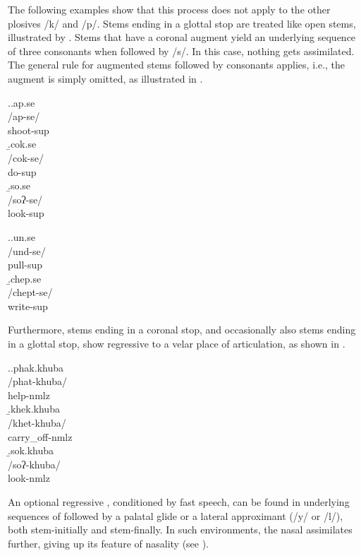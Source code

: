 The following examples show that this process does not apply to the other plosives /k/ and /p/. Stems ending in a glottal stop are treated like open stems, illustrated by \Next[c].	Stems that have a coronal augment yield an underlying sequence of three consonants when followed by /s/. In this case, nothing gets assimilated. The general rule for augmented stems followed by consonants applies, i.e.,  the augment is simply omitted, as illustrated in \NNext. 
			
		\ex.\a.\glll ap.se\\
		/ap-se/\\
shoot{\sc -sup}\\
\b.\glll cok.se\\
/cok-se/\\
do{\sc -sup}\\
	\b.\glll so.se\\
/soʔ-se/\\
look{\sc -sup}\\
			
			
\ex.\a.\glll un.se\\
		/und-se/\\
		pull{\sc -sup}\\
		\b.\glll  chep.se\\	
			/chept-se/\\
			write{\sc -sup}\\
			
			
Furthermore, stems ending in a coronal stop, and occasionally also stems ending in a glottal stop, show regressive   to a velar place of articulation, as shown in \Next.
			
			\ex.\a.\glll phak.khuba\\
		/phat-khuba/\\
		help{\sc -nmlz}\\
		\b.\glll khek.khuba\\
		/khet-khuba/\\
		carry\_off{\sc -nmlz}\\
		\b.\glll sok.khuba\\
		/soʔ-khuba/\\
		look{\sc -nmlz}\\
	
	
An optional regressive , conditioned by fast speech, can be found in underlying sequences of  followed by a palatal glide or a lateral approximant (/y/ or /l/), both stem-initially and stem-finally. In such environments, the nasal assimilates further, giving up its feature of nasality (see \Next). 

